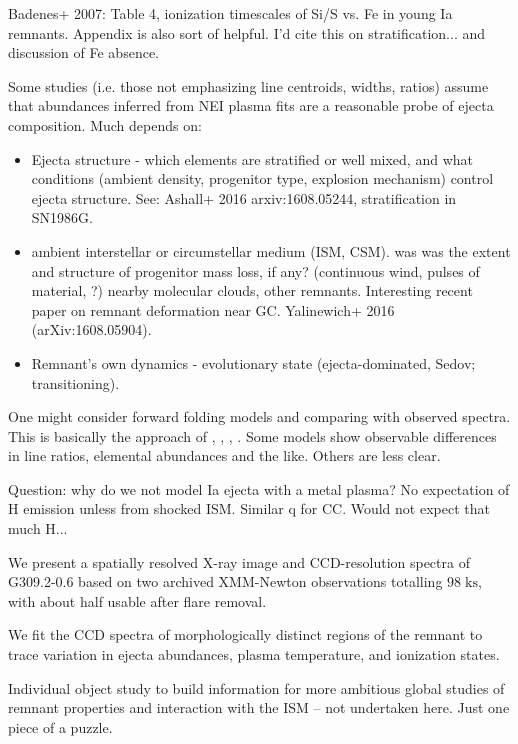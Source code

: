 \documentclass[preprint2,tighten,trackchanges]{aastex6}
\newcommand*{\mt}{\mathrm}
\newcommand*{\unit}[1]{\;\mt{#1}}  %
\begin{document}
Badenes+ 2007: Table 4, ionization timescales of Si/S vs. Fe in young Ia remnants.
Appendix is also sort of helpful.
I'd cite this on stratification... and discussion of Fe absence.

Some studies (i.e. those not emphasizing line centroids, widths, ratios) assume
that abundances inferred from NEI plasma fits are a reasonable probe of ejecta
composition.  Much depends on:
\begin{itemize}
    \item Ejecta structure - which elements are stratified or well mixed, and
        what conditions (ambient density, progenitor type, explosion mechanism)
        control ejecta structure.
        See: Ashall+ 2016 arxiv:1608.05244, stratification in SN1986G.
    \item ambient interstellar or circumstellar medium (ISM, CSM).
        was was the extent and structure of progenitor mass loss, if any?
        (continuous wind, pulses of material, ?)
        nearby molecular clouds, other remnants.
        Interesting recent paper on remnant deformation near GC.
        Yalinewich+ 2016 (arXiv:1608.05904).
    \item Remnant's own dynamics - evolutionary state (ejecta-dominated, Sedov;
        transitioning).
\end{itemize}

One might consider forward folding models and comparing with observed spectra.
This is basically the approach of \citet{hughes1995}, \citet{badenes2003},
\citet{rakowski2006-g337}, \citet{patnaude2015}.
Some models show observable differences in line ratios, elemental abundances
and the like.  Others are less clear.

Question: why do we not model Ia ejecta with a metal plasma?  No expectation of
H emission unless from shocked ISM.
Similar q for CC.  Would not expect that much H...

We present a spatially resolved X-ray image and CCD-resolution spectra of
G309.2-0.6 based on two archived XMM-Newton observations totalling
$98 \unit{ks}$, with about half usable after flare removal.

We fit the CCD spectra of morphologically distinct regions of the remnant to
trace variation in ejecta abundances, plasma temperature, and ionization
states.

Individual object study to build information for more ambitious global studies
of remnant properties and interaction with the ISM -- not undertaken here.
Just one piece of a puzzle.
\end{document}
